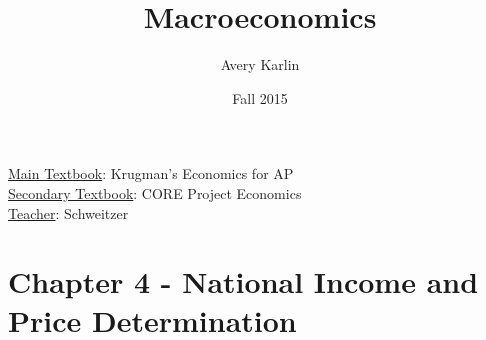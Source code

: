 \documentclass[11 pt, twoside]{article}
\begin{document}
\title{Macroeconomics}
\author{Avery Karlin}
\date{Fall 2015}

\maketitle
\newpage
\tableofcontents
\vspace{11pt}
\noindent
\underline{Main Textbook}: Krugman's Economics for AP\\
\underline{Secondary Textbook}: CORE Project Economics\\
\underline{Teacher}: Schweitzer
\newpage




\section{Chapter 4 - National Income and Price Determination}
\end{document}
